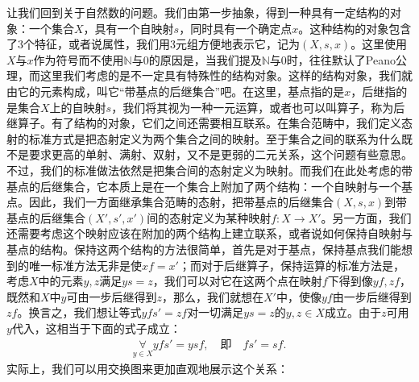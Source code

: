 \documentclass[oneside, 12pt]{ctexart}
\begin{document}
让我们回到关于自然数的问题。我们由第一步抽象，得到一种具有一定结构的对象：一个集合$X$，具有一个自映射$s$，同时具有一个确定点$x$。这种结构的对象包含了$3$个特征，或者说属性，我们用$3$元组方便地表示它，记为$(X, s, x)$。这里使用$X$与$x$作为符号而不使用$\mathbb{N}$与$0$的原因是，当我们提及$\mathbb{N}$与$0$时，往往默认了Peano公理，而这里我们考虑的是不一定具有特殊性的结构对象。这样的结构对象，我们就由它的元素构成，叫它“带基点的后继集合”吧。在这里，基点指的是$x$，后继指的是集合$X$上的自映射$s$，我们将其视为一种一元运算，或者也可以叫算子，称为后继算子。有了结构的对象，它们之间还需要相互联系。在集合范畴中，我们定义态射的标准方式是把态射定义为两个集合之间的映射。至于集合之间的联系为什么既不是要求更高的单射、满射、双射，又不是更弱的二元关系，这个问题有些意思。
不过，我们的标准做法依然是把集合间的态射定义为映射。而我们在此处考虑的带基点的后继集合，它本质上是在一个集合上附加了两个结构：一个自映射与一个基点。因此，我们一方面继承集合范畴的态射，把带基点的后继集合$(X, s, x)$到带基点的后继集合$(X', s', x')$间的态射定义为某种映射$f \colon X \to X'$。另一方面，我们还需要考虑这个映射应该在附加的两个结构上建立联系，或者说如何保持自映射与基点的结构。保持这两个结构的方法很简单，首先是对于基点，保持基点我们能想到的唯一标准方法无非是使$xf = x'$；而对于后继算子，保持运算的标准方法是，考虑$X$中的元素$y, z$满足$ys = z$，我们可以对它在这两个点在映射$f$下得到像$yf, zf$，既然和$X$中$y$可由一步后继得到$z$，那么，我们就想在$X'$中，使像$yf$由一步后继得到$zf$。换言之，我们想让等式$yfs' = zf$对一切满足$ys = z$的$y,z \in X$成立。由于$z$可用$y$代入，这相当于下面的式子成立：
\begin{gather*}
	\mathop{\forall}\limits_{y \in X} yfs' = ysf, \quad \text{即} \quad fs' = sf.
\end{gather*}
实际上，我们可以用交换图来更加直观地展示这个关系：
\begin{center}
\end{center}
\end{document}
